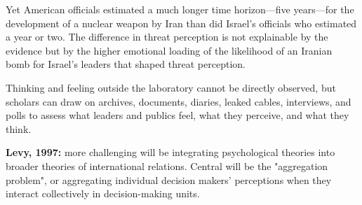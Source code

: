 Yet American officials estimated a much longer time horizon—five years—for the development of a nuclear weapon by Iran than did Israel’s officials who estimated a year or two. The difference in threat perception is not explainable by the evidence but by the higher emotional loading of the likelihood of an Iranian bomb for Israel’s leaders that shaped threat perception.

Thinking and feeling outside the laboratory cannot be directly observed, but scholars can draw on archives, documents, diaries, leaked cables, interviews, and polls to assess what leaders and publics feel, what they perceive, and what they think.

\textbf{Levy, 1997:} more challenging will be integrating psychological theories into broader theories of international relations. Central will be the "aggregation problem", or aggregating individual decision makers' perceptions when they interact collectively in decision-making units.


